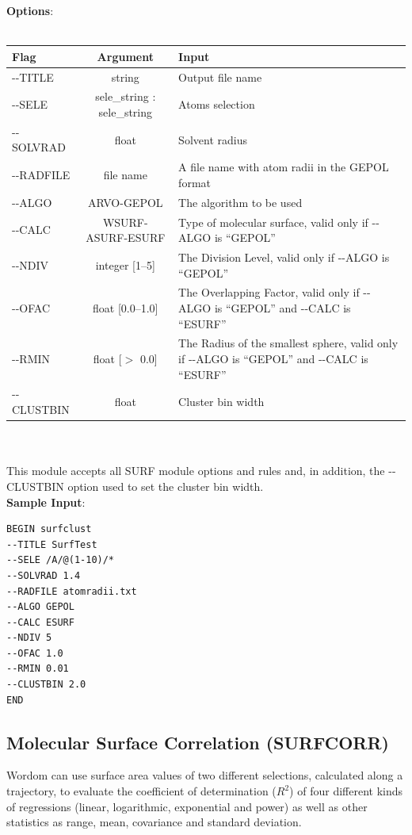 \documentclass[11pt,twoside,onecolumn,a4paper,openright,notitlepage]{book}[2001/04/21]
\begin{document}
\textbf{\large Options}:\\\\
\begin{tabular}{l|c|p{7.0cm}}
Flag & Argument & Input \\
\hline
-{}-TITLE         & string                        & Output file name\\
-{}-SELE          & sele\_string : sele\_string   & Atoms selection\\
-{}-SOLVRAD       & float                         & Solvent radius\\
-{}-RADFILE       & file name                     & A file name with atom radii in the GEPOL format\\
-{}-ALGO          & ARVO-GEPOL                    & The algorithm to be used\\
-{}-CALC          & WSURF-ASURF-ESURF             & Type of molecular surface, valid only if -{}-ALGO is ``GEPOL''\\
-{}-NDIV          & integer [1--5]                & The Division Level, valid only if -{}-ALGO is ``GEPOL''\\
-{}-OFAC          & float [0.0--1.0]              & The Overlapping Factor, valid only if -{}-ALGO is ``GEPOL'' and -{}-CALC is ``ESURF''\\
-{}-RMIN          & float [$>$ 0.0]               & The Radius of the smallest sphere, valid only if -{}-ALGO is ``GEPOL'' and -{}-CALC is ``ESURF''\\
-{}-CLUSTBIN      & float                         & Cluster bin width\\
\end{tabular}\\\\

This module accepts all SURF module options and rules and, in addition, the -{}-CLUSTBIN option used to set the
cluster bin width.\\

\textbf{\large Sample Input}:
\begin{verbatim}
BEGIN surfclust
--TITLE SurfTest
--SELE /A/@(1-10)/*
--SOLVRAD 1.4
--RADFILE atomradii.txt
--ALGO GEPOL
--CALC ESURF
--NDIV 5
--OFAC 1.0
--RMIN 0.01
--CLUSTBIN 2.0
END
\end{verbatim}

\subsection{Molecular Surface Correlation (SURFCORR)}
Wordom can use surface area values of two different selections, calculated along a trajectory, to evaluate the
coefficient of determination ($R^{2}$) of four different kinds of regressions (linear, logarithmic, exponential
and power) as well as other statistics as range, mean, covariance and standard deviation.\\
\end{document}
